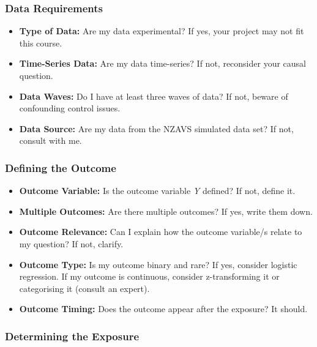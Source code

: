 \documentclass[
  singlecolumn]{article}
\providecommand{\tightlist}{%
  \setlength{\itemsep}{0pt}\setlength{\parskip}{0pt}}\usepackage{longtable,booktabs,array}
\begin{document}
\subsubsection{Data Requirements}\label{data-requirements}

\begin{itemize}
\tightlist
\item
  \textbf{Type of Data:} Are my data experimental? If yes, your project
  may not fit this course.
\item
  \textbf{Time-Series Data:} Are my data time-series? If not, reconsider
  your causal question.
\item
  \textbf{Data Waves:} Do I have at least three waves of data? If not,
  beware of confounding control issues.
\item
  \textbf{Data Source:} Are my data from the NZAVS simulated data set?
  If not, consult with me.
\end{itemize}

\subsubsection{Defining the Outcome}\label{defining-the-outcome}

\begin{itemize}
\tightlist
\item
  \textbf{Outcome Variable:} Is the outcome variable \emph{Y} defined?
  If not, define it.
\item
  \textbf{Multiple Outcomes:} Are there multiple outcomes? If yes, write
  them down.
\item
  \textbf{Outcome Relevance:} Can I explain how the outcome variable/s
  relate to my question? If not, clarify.
\item
  \textbf{Outcome Type:} Is my outcome binary and rare? If yes, consider
  logistic regression. If my outcome is continuous, consider
  z-transforming it or categorising it (consult an expert).
\item
  \textbf{Outcome Timing:} Does the outcome appear after the exposure?
  It should.
\end{itemize}

\subsubsection{Determining the Exposure}\label{determining-the-exposure}
\end{document}
